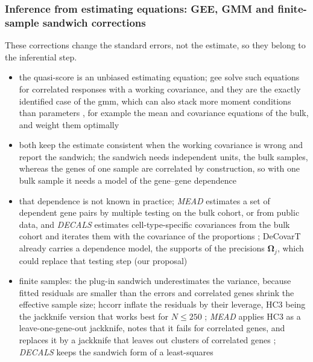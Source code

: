 \documentclass[pdflatex, sn-nature]{sn-jnl}
\theoremstyle{thmstyleone}%
\theoremstyle{thmstyletwo}%
\theoremstyle{thmstylethree}%
\begin{document}
\subsubsection{Inference from estimating equations: GEE, GMM and finite-sample sandwich corrections}
\label{sec:moment-inference}

These corrections change the standard errors, not the estimate, so they belong to the inferential step.

\begin{itemize}
  \item the quasi-score is an unbiased estimating equation; \gls{gee} solve such equations for correlated
        responses with a working covariance, and they are the exactly identified case of the \gls{gmm}, which can
        also stack more moment conditions than parameters \cite{hansenLargeSampleProperties1982}, for example the mean and covariance equations of the
        bulk, and weight them optimally
  \item both keep the estimate consistent when the working covariance is wrong and report the \gls{sandwich};
        the sandwich needs independent units, the bulk samples, whereas the genes of one sample are correlated
        by construction, so with one bulk sample it needs a model of the gene--gene dependence
  \item that dependence is not known in practice; \emph{MEAD} estimates a set of dependent gene pairs by multiple
        testing on the bulk cohort, or from public data, and \emph{DECALS} estimates cell-type-specific covariances
        from the bulk cohort and iterates them with the covariance of the proportions
        \cite{xieStatisticalInferenceCell2026,caiStatisticalInferenceCelltype2024}; DeCovarT already carries a
        dependence model, the supports of the precisions \(\boldsymbol{\Omega}_{j}\), which could replace that testing step
        (our proposal)
  \item finite samples: the plug-in sandwich underestimates the variance, because fitted residuals are smaller
        than the errors and correlated genes shrink the effective sample size; \gls{hccorr} inflate the
        residuals by their leverage, HC3 being the jackknife version
        \cite{mackinnonJackKniefeEstimator1985} that works best for \(N\le250\) \cite{longUsingHeteroscedasticityConsistent2000}; \emph{MEAD} applies HC3 as a leave-one-gene-out jackknife, notes that it fails for
        correlated genes, and replaces it by a jackknife that leaves out clusters of correlated genes
        \cite[Sect.~6.3]{xieStatisticalInferenceCell2026}; \emph{DECALS} keeps the sandwich form of a least-squares

\end{itemize}
\end{document}
